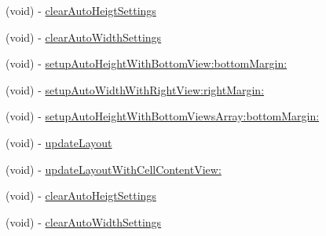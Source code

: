 \begin{DoxyCompactItemize}
\item 
(void) -\/ \mbox{\hyperlink{category_u_i_view_07_s_d_auto_height_width_08_a38d78c51a7fe6eddf23ce486eb838baa}{clear\+Auto\+Heigt\+Settings}}
\item 
(void) -\/ \mbox{\hyperlink{category_u_i_view_07_s_d_auto_height_width_08_ab7b5ebfebbcf5fbc42a3ca4aaa9a4ec3}{clear\+Auto\+Width\+Settings}}
\item 
(void) -\/ \mbox{\hyperlink{category_u_i_view_07_s_d_auto_height_width_08_a6aaa13ab882308efc956c61ce8048d42}{setup\+Auto\+Height\+With\+Bottom\+View\+:bottom\+Margin\+:}}
\item 
(void) -\/ \mbox{\hyperlink{category_u_i_view_07_s_d_auto_height_width_08_a6a5aef3556763e741213220f213ab2dd}{setup\+Auto\+Width\+With\+Right\+View\+:right\+Margin\+:}}
\item 
(void) -\/ \mbox{\hyperlink{category_u_i_view_07_s_d_auto_height_width_08_a48d60ee68bbf7207dc0fbe1b42e4293d}{setup\+Auto\+Height\+With\+Bottom\+Views\+Array\+:bottom\+Margin\+:}}
\item 
(void) -\/ \mbox{\hyperlink{category_u_i_view_07_s_d_auto_height_width_08_a8d81f0e5093a8917c4004c7e1e46ea11}{update\+Layout}}
\item 
(void) -\/ \mbox{\hyperlink{category_u_i_view_07_s_d_auto_height_width_08_ad0e71cc33b6b6cb7ad65236d0a8e5df9}{update\+Layout\+With\+Cell\+Content\+View\+:}}
\item 
(void) -\/ \mbox{\hyperlink{category_u_i_view_07_s_d_auto_height_width_08_a38d78c51a7fe6eddf23ce486eb838baa}{clear\+Auto\+Heigt\+Settings}}
\item 
(void) -\/ \mbox{\hyperlink{category_u_i_view_07_s_d_auto_height_width_08_ab7b5ebfebbcf5fbc42a3ca4aaa9a4ec3}{clear\+Auto\+Width\+Settings}}
\end{DoxyCompactItemize}
